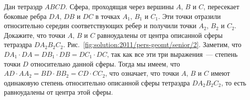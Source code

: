 \problem
Дан тетраэдр $ABCD$.
Сфера, проходящая через вершины $A$, $B$ и $C$, пересекает боковые ребра
$DA$, $DB$ и $DC$ в точках $A_1$, $B_1$ и $C_1$.
Эти точки отразили относительно середин соответствующих ребер и получили точки
$A_2$, $B_2$ и $C_2$.
Докажите, что точки $A$, $B$ и $C$ равноудалены от центра описанной
сферы тетраэдра $D A_2 B_2 C_2$.
%
\label{solution:2011/pers-geomt/senior/2}%
Рис.~\ref{fig:solution:2011/pers-geomt/senior/2}.
Заметим, что $D A_1 \cdot DA = D B_1 \cdot DB = D C_1 \cdot DC$, так как все
эти три выражения~--- степень точки $D$ относительно данной сферы.
Тогда мы имеем, что
$AD \cdot A A_2 = BD \cdot B B_2 = CD \cdot C C_2$,
что означает, что точки $A$, $B$ и $C$ имеют одинаковую степень относительно
описанной сферы тетраэдра $D A_2 B_2 C_2$, то есть равноудалены от центра этой
сферы.
\endproblem
